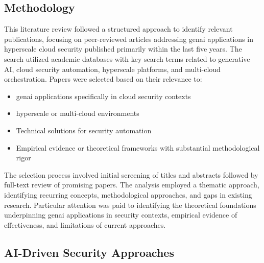 \subsection{Methodology} %
\label{sec:Methodology}

This literature review followed a structured approach to identify relevant publications, focusing on peer-reviewed articles addressing \gls{genai} applications in \gls{hyperscale} cloud security published primarily within the last five years. The search utilized academic databases with key search terms related to generative AI, cloud security automation, \gls{hyperscale} platforms, and \gls{multi-cloud} orchestration. Papers were selected based on their relevance to:

\begin{itemize}
\item \gls{genai} applications specifically in cloud security contexts
\item \gls{hyperscale} or \gls{multi-cloud} environments
\item Technical solutions for security automation
\item Empirical evidence or theoretical frameworks with substantial methodological rigor
\end{itemize}

The selection process involved initial screening of titles and abstracts followed by full-text review of promising papers. The analysis employed a thematic approach, identifying recurring concepts, methodological approaches, and gaps in existing research. Particular attention was paid to identifying the theoretical foundations underpinning \gls{genai} applications in security contexts, empirical evidence of effectiveness, and limitations of current approaches.

\subsection{AI-Driven Security Approaches} %
\label{sec:AI-Driven Security Approaches}

